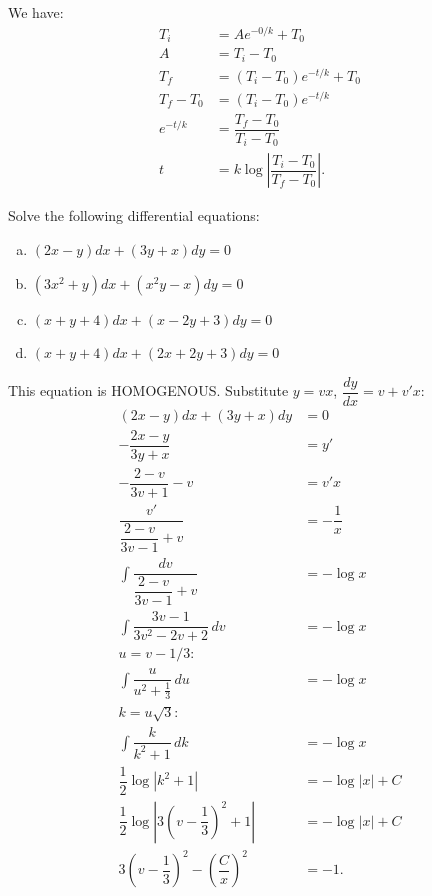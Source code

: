 \documentclass{article}
\begin{document}
    \begin{solution}[Solution 3b]
        We have:
        \begin{align}
            T_i &= Ae^{-0/k} + T_0 \\ 
            A &= T_i - T_0 \\ 
            T_f &= (T_i - T_0)e^{-t/k} + T_0 \\ 
            T_f - T_0 &= (T_i - T_0)e^{-t/k} \\ 
            e^{-t/k} &= \dfrac{T_f-T_0}{T_i - T_0} \\ 
            t &= k\log \left|\dfrac{T_i - T_0}{T_f - T_0}\right|.
        \end{align}
    \end{solution}
    \newpage
    \begin{problem}
        Solve the following differential equations:
        \begin{enumerate}[(a)]
            \item $(2x-y) dx  +(3y+x) dy =0 $
            \item $(3x^2 +y)dx + (x^2y - x) dy = 0$
            \item $(x+y+4) dx + (x-2y+3)dy = 0$
            \item $(x+y+4) dx + (2x + 2y +3) dy = 0$
        \end{enumerate}
    \end{problem}
    \begin{solution}[Solution 4a]
        This equation is HOMOGENOUS. Substitute $y = vx$, $\dfrac{dy}{dx} = v + v'x$:
        \begin{align}
            (2x-y) dx  +(3y+x) dy &=0 \\ 
            -\dfrac{2x-y}{3y+x} &= y' \\ 
            -\dfrac{2-v}{3v+1} -v&= v'x \\
            \dfrac{v'}{\dfrac{2-v}{3v-1} + v} &= -\dfrac{1}{x} \\ 
            \int \dfrac{dv}{\dfrac{2-v}{3v-1} + v} &= - \log x \\ 
            \int \dfrac{3v-1}{3v^2-2v+2} \, dv  &= - \log x \\  
            u = v - 1/3: \\ 
            \int \dfrac{u}{u^2 + \frac{1}{3}} \, du  &= - \log x  \\ 
            k = u\sqrt{3}: \\
            \int \dfrac{k}{k^2 + 1} \, dk  &= - \log x  \\ 
            \dfrac{1}{2} \log \left|k^2 + 1 \right| &= - \log |x| + C\\
            \dfrac{1}{2} \log \left|3\left(v-\dfrac{1}{3}\right)^2 + 1 \right| &= - \log |x| + C\\
            3\left(v-\dfrac{1}{3}\right)^2 - \left(\dfrac{C}{x}\right)^2 &= -1.
        \end{align}
    \end{solution}
\end{document}
